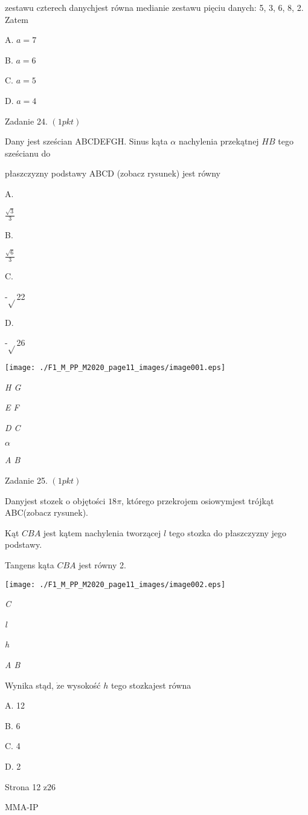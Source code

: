 \documentclass[a4paper,12pt]{article}
\begin{document}
zestawu czterech danychjest równa medianie zestawu pięciu danych: 5, 3, 6, 8, 2. Zatem

A. $a=7$

B. $a=6$

C. $a=5$

D. $a=4$

Zadanie 24. $(1pkt)$

Dany jest sześcian ABCDEFGH. Sinus kąta $\alpha$ nachylenia przekątnej $HB$ tego sześcianu do

płaszczyzny podstawy ABCD (zobacz rysunek) jest równy

A.

$\displaystyle \frac{\sqrt{3}}{3}$

B.

$\displaystyle \frac{\sqrt{6}}{3}$

C.

-$\sqrt{}$22

D.

-$\sqrt{}$26
\begin{center}
\texttt{[image: ./F1\_M\_PP\_M2020\_page11\_images/image001.eps]}
\end{center}
{\it H  G}

{\it E  F}

{\it D  C}

$\alpha$

{\it A  B}

Zadanie 25. $(1pkt)$

Danyjest stozek o objętości $ 18\pi$, którego przekrojem osiowymjest trójkąt ABC(zobacz rysunek).

Kąt $CBA$ jest kątem nachylenia tworzącej $l$ tego stozka do płaszczyzny jego podstawy.

Tangens kąta $CBA$ jest równy 2.
\begin{center}
\texttt{[image: ./F1\_M\_PP\_M2020\_page11\_images/image002.eps]}
\end{center}
{\it C}

{\it l}

{\it h}

{\it A  B}

Wynika stąd, $\dot{\mathrm{z}}\mathrm{e}$ wysokość $h$ tego stozkajest równa

A. 12

B. 6

C. 4

D. 2

Strona 12 z26

MMA-IP
\end{document}
